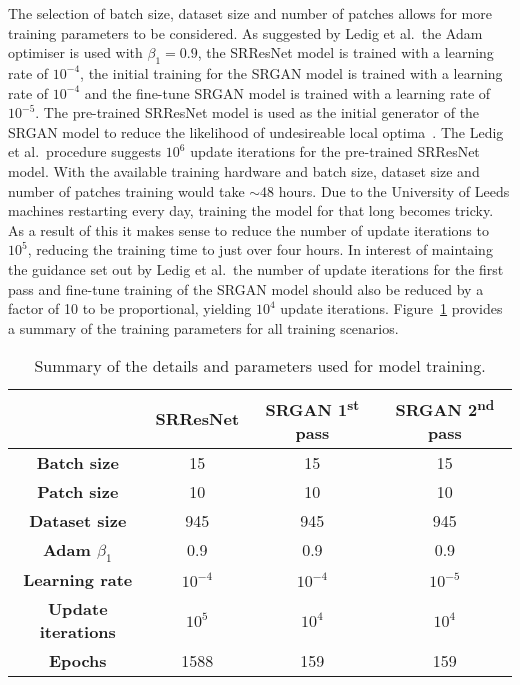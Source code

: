 The selection of batch size, dataset size and number of patches allows for more training parameters to be considered. As suggested by Ledig et al.\ the Adam optimiser is used with $\beta_1 = 0.9$, the SRResNet model is trained with a learning rate of $10^{-4}$, the initial training for the SRGAN model is trained with a learning rate of $10^{-4}$ and the fine-tune SRGAN model is trained with a learning rate of $10^{-5}$. The pre-trained SRResNet model is used as the initial generator of the SRGAN model to reduce the likelihood of undesireable local optima~\cite{srgan}. The Ledig et al.\ procedure suggests $10^6$ update iterations for the pre-trained SRResNet model. With the available training hardware and batch size, dataset size and number of patches training would take $\sim$48 hours. Due to the University of Leeds machines restarting every day, training the model for that long becomes tricky. As a result of this it makes sense to reduce the number of update iterations to $10^{5}$, reducing the training time to just over four hours. In interest of maintaing the guidance set out by Ledig et al.\ the number of update iterations for the first pass and fine-tune training of the SRGAN model should also be reduced by a factor of 10 to be proportional, yielding $10^4$ update iterations. Figure~\ref{table:model_training} provides a summary of the training parameters for all training scenarios.

\begin{table}
    \centering
    \begin{tabular}{|c|c|c|c|}
        \hline
        {} & \textbf{SRResNet} & \textbf{SRGAN 1\textsuperscript{st} pass} & \textbf{SRGAN 2\textsuperscript{nd} pass} \\
        \hline
        \textbf{Batch size} & 15 & 15 & 15\\ 
        \textbf{Patch size} & 10 & 10 & 10\\
        \textbf{Dataset size} & 945 & 945 & 945\\
        \textbf{Adam $\beta_1$} & 0.9 & 0.9 & 0.9\\
        \textbf{Learning rate} & $10^{-4}$ & $10^{-4}$ & $10^{-5}$ \\
        \textbf{Update iterations} & $10^5$ & $10^4$ & $10^4$ \\
        \textbf{Epochs} & 1588 & 159 & 159 \\
        \hline
    \end{tabular}
    \caption{Summary of the details and parameters used for model training.}
    \label{table:model_training}
\end{table}

